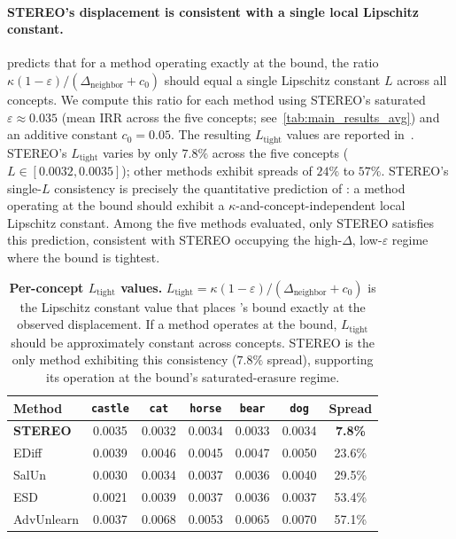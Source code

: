 \paragraph{STEREO's displacement is consistent with a single local Lipschitz constant.}
 predicts that for a method operating exactly at the bound, the ratio $\kappa(1-\varepsilon)/(\Delta_{\text{neighbor}} + c_0)$ should equal a single Lipschitz constant $L$ across all concepts. We compute this ratio for each method using STEREO's saturated $\varepsilon \approx 0.035$ (mean IRR across the five concepts; see~\cref{tab:main_results_avg})  and an additive constant $c_0 = 0.05$.
 The resulting $L_{\text{tight}}$ values are reported in~. STEREO's $L_{\text{tight}}$ varies by only $7.8\%$ across the five concepts ($L \in [0.0032, 0.0035]$); other methods exhibit spreads of $24\%$ to $57\%$. STEREO's single-$L$ consistency is precisely the quantitative prediction of : a method operating at the bound should exhibit a $\kappa$-and-concept-independent local Lipschitz constant. Among the five methods evaluated, only STEREO satisfies this prediction, consistent with STEREO occupying the high-$\Delta$, low-$\varepsilon$ regime where the bound is tightest.

\begin{table}[ht]
\centering
\small
\setlength{\tabcolsep}{6pt}
\begin{tabular}{lcccccc}
\toprule
\textbf{Method} & \texttt{castle} & \texttt{cat} & \texttt{horse} & \texttt{bear} & \texttt{dog} & Spread \\
\midrule
\textbf{STEREO} & 0.0035 & 0.0032 & 0.0034 & 0.0033 & 0.0034 & \textbf{7.8\%} \\
EDiff           & 0.0039 & 0.0046 & 0.0045 & 0.0047 & 0.0050 & 23.6\% \\
SalUn           & 0.0030 & 0.0034 & 0.0037 & 0.0036 & 0.0040 & 29.5\% \\
ESD             & 0.0021 & 0.0039 & 0.0037 & 0.0036 & 0.0037 & 53.4\% \\
AdvUnlearn      & 0.0037 & 0.0068 & 0.0053 & 0.0065 & 0.0070 & 57.1\% \\
\bottomrule
\end{tabular}
\caption{\textbf{Per-concept $L_{\text{tight}}$ values.} $L_{\text{tight}} = \kappa(1-\varepsilon)/(\Delta_{\text{neighbor}} + c_0)$ is the Lipschitz constant value that places 's bound exactly at the observed displacement. If a method operates at the bound, $L_{\text{tight}}$ should be approximately constant across concepts. STEREO is the only method exhibiting this consistency ($7.8\%$ spread), supporting its operation at the bound's saturated-erasure regime.}
\label{tab:l_tight}
\end{table}

